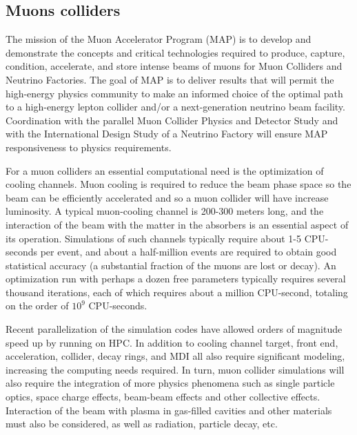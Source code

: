 \subsection{Muons colliders}

The mission of the Muon Accelerator Program (MAP) \cite{map} is to develop and demonstrate the concepts and critical technologies required to produce, capture, condition, accelerate, and store intense beams of muons for Muon Colliders and Neutrino Factories. The goal of MAP is to deliver results that will permit the high-energy physics community to make an informed choice of the optimal path to a high-energy lepton collider and/or a next-generation neutrino beam facility. Coordination with the parallel Muon Collider Physics and Detector Study and with the International Design Study of a Neutrino Factory will ensure MAP responsiveness to physics requirements.


For a muon colliders an essential computational need is the optimization of cooling channels. Muon cooling is required to reduce the beam phase space so the beam can be efficiently accelerated and so a muon collider will have increase luminosity. A typical muon-cooling channel is 200-300 meters long, and the interaction of the beam with the matter in the absorbers is an essential aspect of its operation. Simulations of such channels typically require about 1-5 CPU-seconds per event, and about a half-million events are required to obtain good statistical accuracy (a substantial fraction of the muons are lost or decay). An optimization run with perhaps a dozen free parameters typically requires several thousand iterations, each of which requires about a million CPU-second, totaling on the order of $10^9$ CPU-seconds. 

Recent parallelization of the simulation codes  have allowed orders of magnitude speed up by running on HPC. In addition to cooling channel target, front end, acceleration, collider, decay rings, and MDI all also require significant modeling, increasing the computing needs required. In turn, muon collider simulations will also require the integration of more physics phenomena such as single particle optics, space charge effects, beam-beam effects and other collective effects. Interaction of the beam with plasma in gas-filled cavities and other materials must also be considered, as well as radiation, particle decay, etc.


